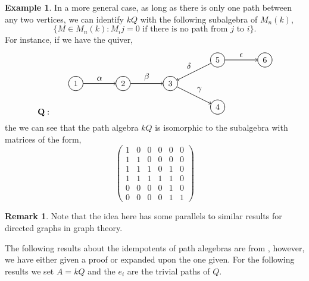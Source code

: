 \documentclass[11.5pt, twoside, a4paper, titlepage]{report}
\providecommand{\equ}[0]{\begin{equation*}}
\providecommand{\eequ}[0] {\end{equation*}}
\theoremstyle{definition}
\newtheorem{rem}[mydef]{Remark}
\newtheorem{eg}[mydef]{Example}
\theoremstyle{plain}
\begin{document}
\begin{eg} \label{pathalgebramatrixeg}
In a more general case, as long as there is only one path between any two vertices, we can identify $kQ$ with the following subalgebra of $M_n(k)$,
\equ
\{M \in M_n(k): M_ij=0 \text{ if there is no path from } j \text{ to }i\}.
\eequ
For instance, if we have the quiver,
\equ
\mathbf{Q}: \qquad
\begin{tikzpicture}[->,-latex, auto, every path/.style={->, semithick}, main node/.style={draw, circle}]
\node	[main node]		(1) at (0,0)		{1};
\node [main node]		(2) at (2,0)		{2};
\node [main node]		(3) at (4,0)		{3};
\node [main node]		(4) at (6,-1)		{4};
\node [main node]		(5) at (6,1)		{5};
\node [main node]		(6) at (8, 1)		{6};

\draw (1) edge node [auto] {$\alpha$} (2);
\draw (2) edge node [auto] {$\beta$} (3);
\draw (3) edge node [auto] {$\gamma$} (4);
\draw (5) edge node [auto, swap] {$\delta$} (3);
\draw (5) edge node [auto] {$\epsilon$} (6);
\end{tikzpicture}
\eequ
the we can see that the path algebra $kQ$ is isomorphic to the subalgebra with matrices of the form,
\equ
\begin{pmatrix*}
1 & 0 & 0 & 0 & 0 & 0 \\
1 & 1 & 0 & 0 & 0 & 0 \\
1 & 1 & 1 & 0 & 1 & 0 \\
1 & 1 & 1 & 1 & 1 & 0 \\
0 & 0 & 0 & 0 & 1 & 0 \\
0 & 0 & 0 & 0 & 1 & 1
\end{pmatrix*}
\eequ
\end{eg}

\begin{rem}
Note that the idea here has some parallels to similar results for directed graphs in graph theory.
\end{rem}

The following results about the idempotents of path alegebras are from \cite{CB2}, however, we have either given a proof or expanded upon the one given. For the following results we set $A=kQ$ and the $e_i$ are the trivial paths of $Q$.
\end{document}
